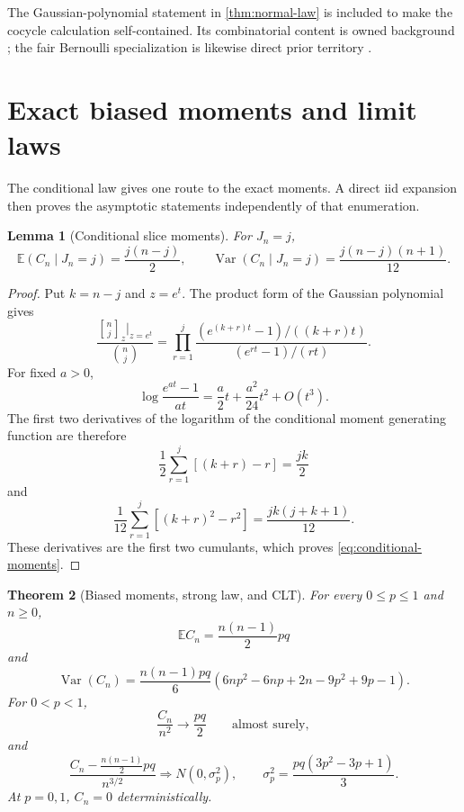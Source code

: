 \documentclass[11pt,a4paper]{amsart}
\newtheorem{theorem}{Theorem}[section]
\newtheorem{lemma}[theorem]{Lemma}
\theoremstyle{definition}
\theoremstyle{remark}
\newcommand{\Exp}{\mathbb E}
\newcommand{\gauss}[2]{\genfrac{[}{]}{0pt}{}{#1}{#2}_{z}}
\begin{document}
The Gaussian-polynomial statement in \cref{thm:normal-law} is included to
make the cocycle calculation self-contained.  Its combinatorial content is
owned background \cite{CanfieldJansonZeilberger2011}; the fair Bernoulli
specialization is likewise direct prior territory
\cite{Takacs1986,Janson2012}.

\section{Exact biased moments and limit laws}
\label{sec:moments}

The conditional law gives one route to the exact moments.  A direct iid
expansion then proves the asymptotic statements independently of that
enumeration.

\begin{lemma}[Conditional slice moments]
\label{lem:slice-moments}
For $J_n=j$,
\begin{equation}\label{eq:conditional-moments}
 \Exp(C_n\mid J_n=j)=\frac{j(n-j)}2,
 \qquad
 \operatorname{Var}(C_n\mid J_n=j)
 =\frac{j(n-j)(n+1)}{12}.
\end{equation}
\end{lemma}

\begin{proof}
Put $k=n-j$ and $z=e^t$.  The product form of the Gaussian polynomial
gives
\[
 \frac{\gauss{n}{j}\big|_{z=e^t}}{\binom nj}
 =\prod_{r=1}^j
 \frac{(e^{(k+r)t}-1)/((k+r)t)}{(e^{rt}-1)/(rt)}.
\]
For fixed $a>0$,
\[
 \log\frac{e^{at}-1}{at}=\frac{a}{2}t+\frac{a^2}{24}t^2+O(t^3).
\]
The first two derivatives of the logarithm of the conditional moment
generating function are therefore
\[
 \frac12\sum_{r=1}^j[(k+r)-r]=\frac{jk}{2}
\]
and
\[
 \frac1{12}\sum_{r=1}^j[(k+r)^2-r^2]
 =\frac{jk(j+k+1)}{12}.
\]
These derivatives are the first two cumulants, which proves
\eqref{eq:conditional-moments}.
\end{proof}

\begin{theorem}[Biased moments, strong law, and CLT]
\label{thm:moments-clt}
For every $0\leq p\leq1$ and $n\geq0$,
\begin{equation}\label{eq:mean}
 \Exp C_n=\frac{n(n-1)}2pq
\end{equation}
and
\begin{equation}\label{eq:variance}
 \boxed{\quad
 \operatorname{Var}(C_n)
 =\frac{n(n-1)pq}{6}
 \left(6np^2-6np+2n-9p^2+9p-1\right).
 \quad}
\end{equation}
For $0<p<1$,
\begin{equation}\label{eq:slln}
 \frac{C_n}{n^2}\longrightarrow\frac{pq}{2}
 \qquad\text{almost surely},
\end{equation}
and
\begin{equation}\label{eq:clt}
 \frac{C_n-\frac{n(n-1)}2pq}{n^{3/2}}
 \Longrightarrow N(0,\sigma_p^2),
 \qquad
 \sigma_p^2=\frac{pq(3p^2-3p+1)}{3}.
\end{equation}
At $p=0,1$, $C_n=0$ deterministically.
\end{theorem}
\end{document}
